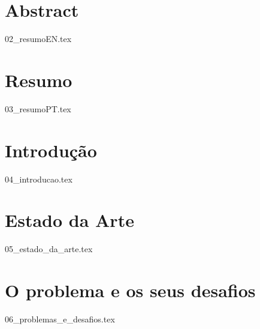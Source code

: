 \documentclass[
  oneside,
  11pt, a4paper,
  footinclude=true,
  headinclude=true,
  cleardoublepage=empty
]{scrbook}
\author{José Carlos Lima Martins}
\date{\myear} %
\begin{document}
    \umfrontcover{}
    \umtitlepage{}
	

	\chapter*{Abstract}
    {02_resumoEN.tex}
	
    \cleardoublepage{}
	\chapter*{Resumo}
    {03_resumoPT.tex}
	
	\tableofcontents
	\listoffigures
	\listoftables
    \printglossary[]
    \printglossary[type=\acronymtype, title=Lista de Acrónimos]
	
	
	\chapter{Introdução}
    {04_introducao.tex}

	\chapter{Estado da Arte}
    {05_estado_da_arte.tex}

	\chapter{O problema e os seus desafios}
    {06_problemas_e_desafios.tex}

		
\end{document}
